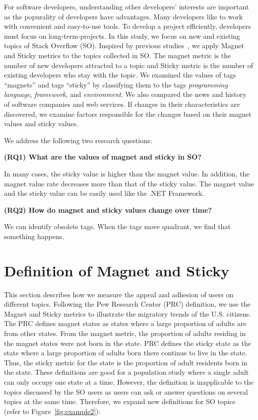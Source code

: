 \documentclass[english,preprint,JIP,technote]{ipsj}
\begin{document}
For software developers, understanding other developers’ interests are important as the popurality of developers have advantages. Many developers like to work with convenient and easy-to-use tools. To develop a project efficiently, developers must focus on long-term-projects. In this study, we focus on new and existing topics of Stack Overflow (SO)\cite{nasehi2012makes}. Inspired by previous studies~\cite{yamashita2016magnet}, we apply Magnet and Sticky metrics to the topics collected in SO. 
The magnet metric is the number of new developers attracted to a topic and Sticky metric is the number of existing developers who stay with the topic. 
We examined the values of tags “magnets” and tags “sticky” by classifying them to the tags \emph{programming language}, \emph{framework}, and \emph{environment}. We also compared the news and history of software  companies and web services. If changes in their characteristics are discovered, we examine factors responsible for the changes based on their magnet values and sticky values. 

We address the following two research questions:

\noindent \textbf{(RQ1) What are the values of magnet and sticky in SO?}\par
In many cases, the sticky value is higher than the magnet value. In addition, the magnet value rate decreases more than that of the sticky value. The magnet value and the sticky value can be easily used like the .NET Framework\cite{lapalme2004net}.

\noindent \textbf{(RQ2) How do magnet and sticky values change over time?}\par
We can identify obsolete tags. When the tags move quadrant, we find that something happens.


\section{Definition of Magnet and Sticky} \label{magnet}
This section describes how we measure the appeal and adhesion of users on different topics. Following the Pew Research Center (PRC) definition, we use the Magnet and Sticky metrics to illustrate the migratory trends of the U.S. citizens. The PRC defines magnet states as states where a large proportion of adults are from other states. From the magnet metric, the proportion of adults residing in the magnet states were not born in the state. PRC defines the sticky state as the state where a large proportion of adults born there continue to live in the state. Thus, the sticky metric for the state is the proportion of adult residents born in the state. These definitions are good for a population study where a single adult can only occupy one state at a time. However, the definition is inapplicable to the topics discussed by the SO users as users can ask or answer questions on several topics at the same time. Therefore, we expand new definitions for SO topics (refer to Figure~\ref{fig:example2}):
\end{document}
